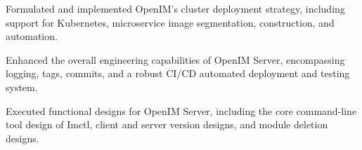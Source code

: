 \begin{cventries}
{\begin{cvitems}
        \item {Formulated and implemented OpenIM's cluster deployment strategy, including support for Kubernetes, microservice image segmentation, construction, and automation.}
        \item {Enhanced the overall engineering capabilities of OpenIM Server, encompassing logging, tags, commits, and a robust CI/CD automated deployment and testing system.}
        \item {Executed functional designs for OpenIM Server, including the core command-line tool design of Imctl, client and server version designs, and module deletion designs.}
      \end{cvitems}
    }



\end{cventries}
